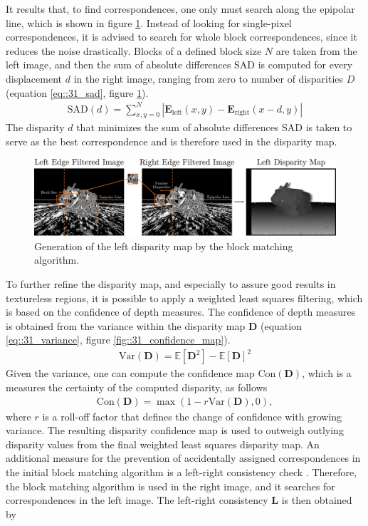 It results that, to find correspondences, one only must search along the epipolar line, which is shown in figure \ref{fig::31_left_disparity_map}. Instead of looking for single-pixel correspondences, it is advised to search for whole block correspondences, since it reduces the noise drastically. Blocks of a defined block size $N$ are taken from the left image, and then the sum of absolute differences SAD is computed for every displacement $d$ in the right image, ranging from zero to number of disparities $D$ (equation \ref{eq::31_sad}, figure \ref{fig::31_left_disparity_map}).
\begin{align}
	\text{SAD}(d) = \sum_{x,y=0}^N |\bm{E}_\text{left}(x,y) - \bm{E}_\text{right}(x-d,y)|
	\label{eq::31_sad}
\end{align}
The disparity $d$ that minimizes the sum of absolute differences SAD is taken to serve as the best correspondence and is therefore used in the disparity map.
\begin{figure}[h!]
	\centering
	\includegraphics[scale=.28]{chapters/03_fundamentals_of_image_processing/img/left_disparity_map.png}
	\caption{Generation of the left disparity map by the block matching algorithm.}
	\label{fig::31_left_disparity_map}
\end{figure}
To further refine the disparity map, and especially to assure good results in textureless  regions, it is possible to apply a weighted least squares filtering, which is based on the confidence of depth measures. The confidence of depth measures is obtained from the variance within the disparity map $\bm{D}$ (equation \ref{eq::31_variance}, figure \ref{fig::31_confidence_map}).
\begin{align}
	 \text{Var}(\bm{D}) = \mathbb{E}\left[\bm{D}^2\right] - \mathbb{E}\left[\bm{D}\right]^2
	\label{eq::31_variance}
\end{align} 
Given the variance, one can compute the confidence map $\text{Con}(\bm{D})$, which is a measures the certainty of the computed disparity, as follows
\begin{align}
	\text{Con}(\bm{D}) = \max\left(1-r\text{Var}(\bm{D}),0\right),
\end{align}
where $r$ is a roll-off factor that defines the change of confidence with growing variance. The resulting disparity confidence map is used to outweigh outlying disparity values from the final weighted least squares disparity map. An additional measure for the prevention of accidentally assigned correspondences in the initial block matching algorithm is a left-right consistency check \cite{egnal2004stereo}. Therefore, the block matching algorithm is used in the right image, and it searches for correspondences in the left image. The left-right consistency $\bm{L}$ is then obtained by 
